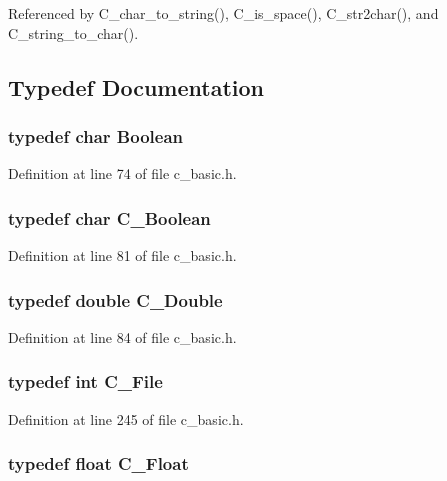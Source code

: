 Referenced by C\_\-char\_\-to\_\-string(), C\_\-is\_\-space(), C\_\-str2char(), and C\_\-string\_\-to\_\-char().

\subsection{Typedef Documentation}
\subsubsection{\setlength{\rightskip}{0pt plus 5cm}typedef char \bf{Boolean}}\label{c__basic_8h_2d275961e4a2bd704dde5f6a5d27f880}




Definition at line 74 of file c\_\-basic.h.
\subsubsection{\setlength{\rightskip}{0pt plus 5cm}typedef char \bf{C\_\-Boolean}}\label{c__basic_8h_1ef91f83ddf6e8075b1ffa6e6814df25}




Definition at line 81 of file c\_\-basic.h.
\subsubsection{\setlength{\rightskip}{0pt plus 5cm}typedef double \bf{C\_\-Double}}\label{c__basic_8h_4d293d4b3ad65b5c299cc109a0d0b19d}




Definition at line 84 of file c\_\-basic.h.
\subsubsection{\setlength{\rightskip}{0pt plus 5cm}typedef int \bf{C\_\-File}}\label{c__basic_8h_22afcb874de8d9aee20cecc464624409}




Definition at line 245 of file c\_\-basic.h.
\subsubsection{\setlength{\rightskip}{0pt plus 5cm}typedef float \bf{C\_\-Float}}\label{c__basic_8h_b769fc4a350f252ddf20848cb1f107ec}




